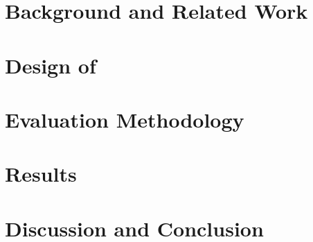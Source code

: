\documentclass[conference,table]{IEEEtran}
\begin{document}
\section{Background and Related Work}
\label{sec:bgreltool}


\section{Design of \parlot}
\label{sec:design}


\section{Evaluation Methodology}
\label{sec:evalmeth}


\section{Results}
\label{sec:results}
%

%
%
%


    

\section{Discussion and Conclusion}
\label{sec:concl}







\end{document}
